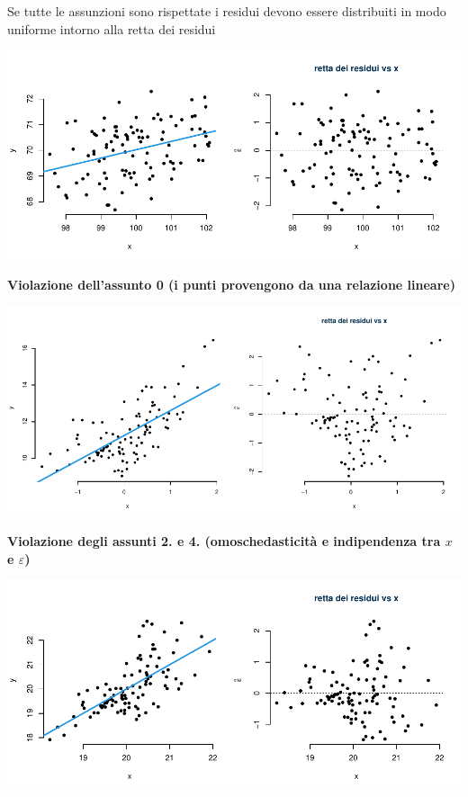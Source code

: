 \documentclass[
  11pt,
]{book}
\theoremstyle{mytheoremstyle}
\theoremstyle{mydefstyle}
\begin{document}
Se tutte le assunzioni sono rispettate i residui devono essere distribuiti
in modo uniforme intorno alla retta dei residui

\begin{center}\includegraphics{Appunti_di_Statistica_2025_files/figure-latex/18-regressione-II-13-1} \end{center}

\textbf{Violazione dell'assunto 0 (i punti provengono da una relazione lineare)}

\begin{center}\includegraphics{Appunti_di_Statistica_2025_files/figure-latex/18-regressione-II-15-1} \end{center}

\textbf{Violazione degli assunti 2. e 4. (omoschedasticità e indipendenza tra \(x\) e \(\varepsilon\))}

\begin{center}\includegraphics{Appunti_di_Statistica_2025_files/figure-latex/18-regressione-II-17-1} \end{center}
\end{document}
